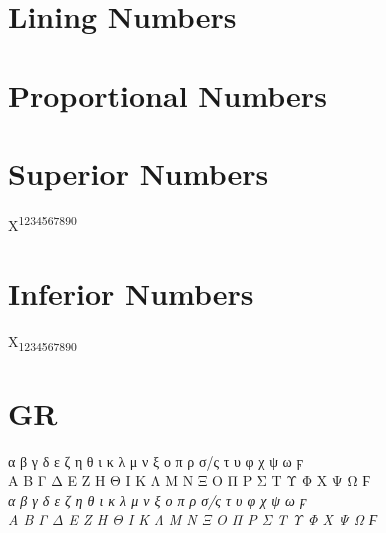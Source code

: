 \documentclass[a4paper]{article}
\begin{document}

\section*{Lining Numbers}


\section*{Proportional Numbers}


\section*{Superior Numbers}

X\textsuperscript{1234567890}

\section*{Inferior Numbers}

X\textsubscript{1234567890}

\section*{GR}

 α β γ δ ε ζ η θ ι κ λ μ ν ξ ο π ρ σ/ς τ υ φ χ ψ ω ϝ \\
 Α Β Γ Δ Ε Ζ Η Θ Ι Κ Λ Μ Ν Ξ Ο Π Ρ Σ Τ Υ Φ Χ Ψ Ω Ϝ\\
\emph{ α β γ δ ε ζ η θ ι κ λ μ ν ξ ο π ρ σ/ς τ υ φ χ ψ ω ϝ\\
 Α Β Γ Δ Ε Ζ Η Θ Ι Κ Λ Μ Ν Ξ Ο Π Ρ Σ Τ Υ Φ Χ Ψ Ω Ϝ}\par
 
\end{document}
